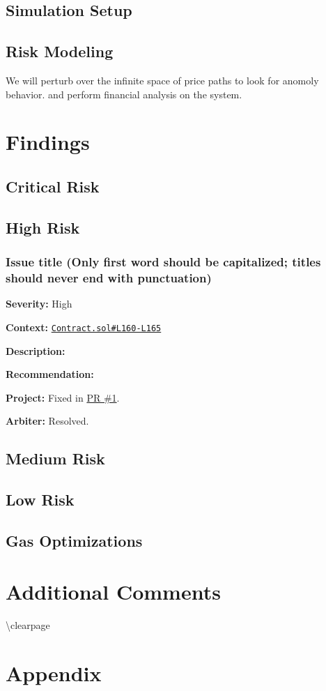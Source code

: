 \documentclass[14pt]{extarticle}
\begin{document}

\subsection{Simulation Setup}\label{simulation-setup}

\subsection{Risk Modeling}\label{risk-modeling}

We will perturb over the infinite space of price paths to look for anomoly behavior. and perform financial analysis on the system.

\section{Findings}\label{findings}

\subsection{Critical Risk}\label{critical-risk}

\subsection{High Risk}\label{high-risk}

\subsubsection{Issue title (Only first word should be capitalized;
titles should never end with
punctuation)}\label{issue-title-only-first-word-should-be-capitalized-titles-should-never-end-with-punctuation}

\textbf{Severity:} High

\textbf{Context:}
\href{https://github.com/actuallink}{\texttt{Contract.sol\#L160-L165}}

\textbf{Description:}


\textbf{Recommendation:}


\textbf{Project:} Fixed in \href{Https://github.com/actuallink}{PR \#1}.

\textbf{Arbiter:} Resolved.

\subsection{Medium Risk}\label{medium-risk}

\subsection{Low Risk}\label{low-risk}

\subsection{Gas Optimizations}\label{gas-optimizations}

\section{Additional Comments}\label{additional-comments}

\textbackslash clearpage

\section{Appendix}\label{appendix}
\end{document}
